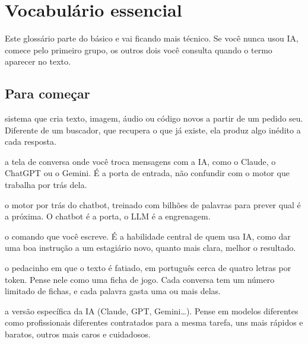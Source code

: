 \documentclass[11pt,a4paper]{article}
\begin{document}
\clearpage
\thispagestyle{empty}
\vspace*{0.2cm}
\setcounter{tocdepth}{1}
\renewcommand{\contentsname}{Sumário}
\tableofcontents

\clearpage

\section{Vocabulário essencial}
\small
Este glossário parte do básico e vai ficando mais técnico. Se você nunca usou IA, comece pelo primeiro grupo, os outros dois você consulta quando o termo aparecer no texto.

\subsection*{Para começar}
\begin{description}[style=nextline,leftmargin=0pt,itemsep=6pt]
  \item[\poppinsmed\color{azulUNI}IA generativa] sistema que cria texto, imagem, áudio ou código novos a partir de um pedido seu. Diferente de um buscador, que recupera o que já existe, ela produz algo inédito a cada resposta.
  \item[\poppinsmed\color{azulUNI}Chatbot/assistente conversacional] a tela de conversa onde você troca mensagens com a IA, como o Claude, o ChatGPT ou o Gemini. É a porta de entrada, não confundir com o motor que trabalha por trás dela.
  \item[\poppinsmed\color{azulUNI}LLM (Modelo de Linguagem Grande)] o motor por trás do chatbot, treinado com bilhões de palavras para prever qual é a próxima. O chatbot é a porta, o LLM é a engrenagem.
  \item[\poppinsmed\color{azulUNI}Prompt] o comando que você escreve. É a habilidade central de quem usa IA, como dar uma boa instrução a um estagiário novo, quanto mais clara, melhor o resultado.
  \item[\poppinsmed\color{azulUNI}Token] o pedacinho em que o texto é fatiado, em português cerca de quatro letras por token. Pense nele como uma ficha de jogo. Cada conversa tem um número limitado de fichas, e cada palavra gasta uma ou mais delas.
  \item[\poppinsmed\color{azulUNI}Modelo] a versão específica da IA (Claude, GPT, Gemini\ldots). Pense em modelos diferentes como profissionais diferentes contratados para a mesma tarefa, uns mais rápidos e baratos, outros mais caros e cuidadosos.
\end{description}
\end{document}
